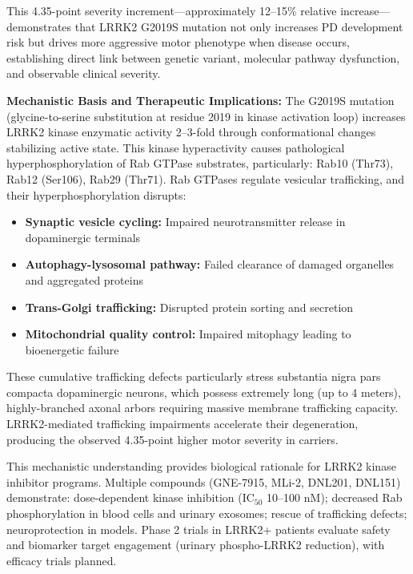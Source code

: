 \documentclass[11pt]{article}
\begin{document}
This 4.35-point severity increment—approximately 12--15\% relative increase—demonstrates that LRRK2 G2019S mutation not only increases PD development risk but drives more aggressive motor phenotype when disease occurs, establishing direct link between genetic variant, molecular pathway dysfunction, and observable clinical severity.

\textbf{Mechanistic Basis and Therapeutic Implications:} The G2019S mutation (glycine-to-serine substitution at residue 2019 in kinase activation loop) increases LRRK2 kinase enzymatic activity 2--3-fold through conformational changes stabilizing active state\cite{west2023lrrk2,alessi2018lrrk2}. This kinase hyperactivity causes pathological hyperphosphorylation of Rab GTPase substrates, particularly: Rab10 (Thr73), Rab12 (Ser106), Rab29 (Thr71)\cite{steger2016phosphoproteomics,karayel2020accurate}. Rab GTPases regulate vesicular trafficking, and their hyperphosphorylation disrupts:

\begin{itemize}
\item \textbf{Synaptic vesicle cycling:} Impaired neurotransmitter release in dopaminergic terminals
\item \textbf{Autophagy-lysosomal pathway:} Failed clearance of damaged organelles and aggregated proteins
\item \textbf{Trans-Golgi trafficking:} Disrupted protein sorting and secretion
\item \textbf{Mitochondrial quality control:} Impaired mitophagy leading to bioenergetic failure
\end{itemize}

These cumulative trafficking defects particularly stress substantia nigra pars compacta dopaminergic neurons, which possess extremely long (up to 4 meters), highly-branched axonal arbors requiring massive membrane trafficking capacity\cite{bolam2000living}. LRRK2-mediated trafficking impairments accelerate their degeneration, producing the observed 4.35-point higher motor severity in carriers.

This mechanistic understanding provides biological rationale for LRRK2 kinase inhibitor programs\cite{simuni2024lrrk2,west2023lrrk2}. Multiple compounds (GNE-7915, MLi-2, DNL201, DNL151) demonstrate: dose-dependent kinase inhibition (IC$_{50}$ 10--100 nM); decreased Rab phosphorylation in blood cells and urinary exosomes; rescue of trafficking defects; neuroprotection in models. Phase 2 trials in LRRK2+ patients evaluate safety and biomarker target engagement (urinary phospho-LRRK2 reduction), with efficacy trials planned\cite{simuni2024lrrk2}.
\end{document}
